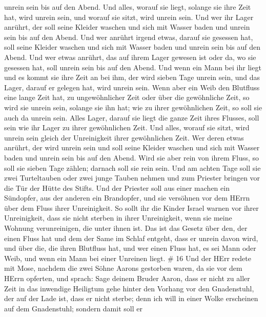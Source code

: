 unrein sein bis auf den Abend.  Und alles, worauf sie
liegt, solange sie ihre Zeit hat, wird unrein sein, und worauf sie
sitzt, wird unrein sein.  Und wer ihr Lager anrührt, der
soll seine Kleider waschen und sich mit Wasser baden und unrein sein bis
auf den Abend.  Und wer anrührt irgend etwas, darauf sie
gesessen hat, soll seine Kleider waschen und sich mit Wasser baden und
unrein sein bis auf den Abend.  Und wer etwas anrührt, das
auf ihrem Lager gewesen ist oder da, wo sie gesessen hat, soll unrein
sein bis auf den Abend.  Und wenn ein Mann bei ihr liegt
und es kommt sie ihre Zeit an bei ihm, der wird sieben Tage unrein sein,
und das Lager, darauf er gelegen hat, wird unrein sein. 
Wenn aber ein Weib den Blutfluss eine lange Zeit hat, zu ungewöhnlicher
Zeit oder über die gewöhnliche Zeit, so wird sie unrein sein, solange
sie ihn hat; wie zu ihrer gewöhnlichen Zeit, so soll sie auch da unrein
sein.  Alles Lager, darauf sie liegt die ganze Zeit ihres
Flusses, soll sein wie ihr Lager zu ihrer gewöhnlichen Zeit. Und alles,
worauf sie sitzt, wird unrein sein gleich der Unreinigkeit ihrer
gewöhnlichen Zeit.  Wer deren etwas anrührt, der wird
unrein sein und soll seine Kleider waschen und sich mit Wasser baden und
unrein sein bis auf den Abend.  Wird sie aber rein von
ihrem Fluss, so soll sie sieben Tage zählen; darnach soll sie rein sein.
 Und am achten Tage soll sie zwei Turteltauben oder zwei
junge Tauben nehmen und zum Priester bringen vor die Tür der Hütte des
Stifts.  Und der Priester soll aus einer machen ein
Sündopfer, aus der anderen ein Brandopfer, und sie versöhnen vor dem
HErrn über dem Fluss ihrer Unreinigkeit.  So sollt ihr die
Kinder Israel warnen vor ihrer Unreinigkeit, dass sie nicht sterben in
ihrer Unreinigkeit, wenn sie meine Wohnung verunreinigen, die unter
ihnen ist.  Das ist das Gesetz über den, der einen Fluss
hat und dem der Same im Schlaf entgeht, dass er unrein davon wird,
 und über die, die ihren Blutfluss hat, und wer einen Fluss
hat, es sei Mann oder Weib, und wenn ein Mann bei einer Unreinen liegt.
\# 16  Und der HErr redete mit Mose, nachdem die zwei Söhne
Aarons gestorben waren, da sie vor dem HErrn opferten,  und
sprach: Sage deinem Bruder Aaron, dass er nicht zu aller Zeit in das
inwendige Heiligtum gehe hinter den Vorhang vor den Gnadenstuhl, der auf
der Lade ist, dass er nicht sterbe; denn ich will in einer Wolke
erscheinen auf dem Gnadenstuhl;  sondern damit soll er
